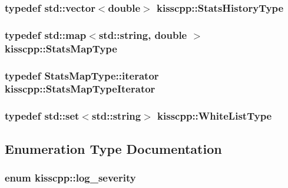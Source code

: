 \hypertarget{a00089_a4629097b5a6697a8a1eefd9ac5b0a2b6}{
\subsubsection[{Stats\-History\-Type}]{\setlength{\rightskip}{0pt plus 5cm}typedef std\-::vector$<$double$>$ {\bf kisscpp\-::\-Stats\-History\-Type}}}\label{a00089_a4629097b5a6697a8a1eefd9ac5b0a2b6}
\hypertarget{a00089_adb9e851c391ea02ff8f961f1cd37ed8c}{
\subsubsection[{Stats\-Map\-Type}]{\setlength{\rightskip}{0pt plus 5cm}typedef std\-::map$<$std\-::string, double $>$ {\bf kisscpp\-::\-Stats\-Map\-Type}}}\label{a00089_adb9e851c391ea02ff8f961f1cd37ed8c}
\hypertarget{a00089_a674afcb960d0097e39ef66ab83af14be}{
\subsubsection[{Stats\-Map\-Type\-Iterator}]{\setlength{\rightskip}{0pt plus 5cm}typedef Stats\-Map\-Type\-::iterator {\bf kisscpp\-::\-Stats\-Map\-Type\-Iterator}}}\label{a00089_a674afcb960d0097e39ef66ab83af14be}
\hypertarget{a00089_a6aa00ccbe46e3a892fa90d3fbf6e3439}{
\subsubsection[{White\-List\-Type}]{\setlength{\rightskip}{0pt plus 5cm}typedef std\-::set$<$std\-::string$>$ {\bf kisscpp\-::\-White\-List\-Type}}}\label{a00089_a6aa00ccbe46e3a892fa90d3fbf6e3439}


\subsection{Enumeration Type Documentation}
\hypertarget{a00089_a2479a56cdedf21357ca5c68adc699d00}{
\subsubsection[{log\-\_\-severity}]{\setlength{\rightskip}{0pt plus 5cm}enum {\bf kisscpp\-::log\-\_\-severity}}}\label{a00089_a2479a56cdedf21357ca5c68adc699d00}


